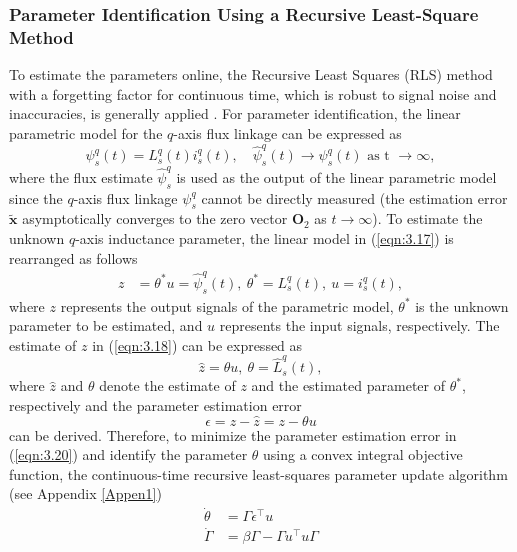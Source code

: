 \subsubsection{Parameter Identification Using a Recursive Least-Square Method}
To estimate the parameters online, the Recursive Least Squares (RLS) method with a forgetting factor for continuous time, which is robust to signal noise and inaccuracies, is generally applied \cite{c3.2_4}. For parameter identification, the linear parametric model for the $q$-axis flux linkage can be expressed as
\begin{equation}\label{eqn:3.17}
    \psi^q_s(t) = L^q_s(t)i^q_s(t), \quad \hat\psi^q_s(t) \rightarrow \psi^q_s(t) \text{ as t } \rightarrow \infty,
\end{equation}
where the flux estimate \(\hat \psi^q_s\) is used as the output of the linear parametric model since the $q$-axis flux linkage \(\psi^q_s\) cannot be directly measured (the estimation error \(\mathbf{\tilde{x}}\) asymptotically converges to the zero vector \(\mathbf{O}_2\) as \(t \rightarrow \infty\)). To estimate the unknown $q$-axis inductance parameter, the linear model in (\ref{eqn:3.17}) is rearranged as follows
\begin{equation}\label{eqn:3.18}
\begin{aligned}
z &= \theta^* u = \hat\psi^q_s(t), \ \theta^* = L^q_s(t), \ u = i^{q}_s(t),
\end{aligned}
\end{equation}
where \(z\) represents the output signals of the parametric model, \(\theta^*\) is the unknown parameter to be estimated, and \(u\) represents the input signals, respectively. The estimate of $z$ in (\ref{eqn:3.18}) can be expressed as  
\begin{equation}\label{eqn:3.19}
\hat{z} = \theta u, \ \theta = \hat{L}^q_s(t),
\end{equation}
where \(\hat{z}\) and \(\theta\) denote the estimate of \(z\) and the estimated parameter of \(\theta^*\), respectively and the parameter estimation error
\begin{equation}\label{eqn:3.20}
\epsilon =z - \hat{z} = z - \theta u
\end{equation}
can be derived. Therefore, to minimize the parameter estimation error in (\ref{eqn:3.20}) and identify the parameter $\theta$ using a convex integral objective function, the continuous-time recursive least-squares parameter update algorithm (see Appendix \ref{Appen1})
\begin{equation}\label{eqn:3.21}
\begin{aligned}
\dot{\theta} &= \Gamma \epsilon^\top u \\
    \dot{\Gamma} &= \beta \Gamma - \Gamma u^\top u \Gamma
\end{aligned}
\end{equation}
